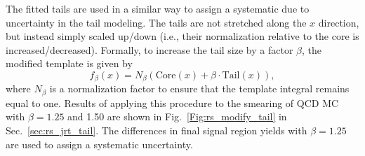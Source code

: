 The fitted tails are used in a similar way to assign a systematic due to uncertainty in the tail modeling.
The tails are not stretched along the $x$ direction, but instead simply scaled up/down (i.e., their normalization
relative to the core is increased/decreased). Formally, to increase the tail size by a factor $\beta$, the
modified template is given by
\[
   f_\beta(x) = N_\beta(\text{Core}(x) + \beta\cdot\text{Tail}(x)),
\]
where $N_\beta$ is a normalization factor to ensure that the template integral remains equal to one.
Results of applying this procedure to the smearing of QCD MC with $\beta=1.25$ and 1.50 
are shown in Fig.~\ref{Fig:rs_modify_tail} in Sec.~\ref{sec:rs_jrt_tail}. 
The differences in final signal region yields with $\beta=1.25$ are used to assign a systematic uncertainty.
